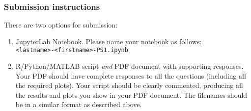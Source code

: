 \documentclass[11pt,twoside]{article}
\newcommand{\pts}[1]{\marginpar{ \small\hspace{0pt} \textit{[#1]} } }
\newcommand{\?}{\stackrel{?}{=}}
\newcommand{\gr}{\color{green!40!black}}
\begin{document}
\subsubsection*{Submission instructions}
There are two options for submission:
\begin{enumerate}
\item JupyterLab Notebook. Please name your notebook as follows: \\ \texttt{<lastname>-<firstname>-PS1.ipynb}
\item R/Python/MATLAB script \textit{and} PDF document with supporting responses.
  Your PDF should have complete responses to all the questions (including all the required plots).
  Your script should be clearly commented, producing all the results and plots you show in your PDF document.
  The filenames should be in a similar format as described above.
\end{enumerate}

\eject

 


  
\end{document}

